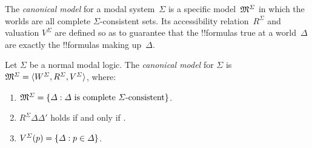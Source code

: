 \documentclass[../../../include/open-logic-section]{subfiles}
\begin{document}


The \emph{canonical model} for a modal system~$\Sigma$ is a specific
model~$\mModel{M^\Sigma}$ in which the worlds are all complete
$\Sigma$-consistent sets. Its accessibility relation~$R^\Sigma$ and
valuation $V^\Sigma$ are defined so as to guarantee that the
!!{formula}s true at a world~$\Delta$ are exactly the !!{formula}s
making up~$\Delta$.

\begin{defn}
  Let $\Sigma$ be a normal modal logic. The \emph{canonical model} for
  $\Sigma$ is $\mModel{M}^\Sigma = \tuple{W^\Sigma, R^\Sigma,
    V^\Sigma}$, where:
  \begin{enumerate}
  \item $\mModel{M}^\Sigma = \Setabs{ \Delta }{\Delta \text{
      is complete $\Sigma$-consistent} }$.
  \item $R^\Sigma \Delta\Delta'$ holds if and only if
    .
  \item $V^\Sigma(p) = \{ \Delta : p \in \Delta \}$.
  \end{enumerate}
\end{defn}
\end{document}
